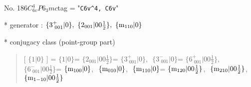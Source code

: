 \documentclass[fleqn,10pt,landscape]{jsarticle}
\begin{document}
\newpage

No. 186\quad$C_{6v}^{4}$\quad$P6_3mc$\quad[ hexagonal ]
tag = "{\tt C6v^4, C6v}"

* generator : $\{3^{+}_{\,\,001}|0\},\,\,\{2{}_{001}|0 0 \frac{1}{2}\},\,\,\{{\rm m}_{110}|0\}$

* conjugacy class (point-group part)
\begin{quote}
[ $\{1|0\}$ ] = \quad $\{1|0\}$\newline[ $\{2{}_{001}|0 0 \frac{1}{2}\}$ ] = \quad $\{2{}_{001}|0 0 \frac{1}{2}\}$\newline[ $\{3^{+}_{\,\,001}|0\}$ ] = \quad $\{3^{+}_{\,\,001}|0\}$,\,\, $\{3^{-}_{\,\,001}|0\}$\newline[ $\{6^{+}_{\,\,001}|0 0 \frac{1}{2}\}$ ] = \quad $\{6^{+}_{\,\,001}|0 0 \frac{1}{2}\}$,\,\, $\{6^{-}_{\,\,001}|0 0 \frac{1}{2}\}$\newline[ $\{{\rm m}_{100}|0\}$ ] = \quad $\{{\rm m}_{100}|0\}$,\,\, $\{{\rm m}_{010}|0\}$,\,\, $\{{\rm m}_{110}|0\}$\newline[ $\{{\rm m}_{120}|0 0 \frac{1}{2}\}$ ] = \quad $\{{\rm m}_{120}|0 0 \frac{1}{2}\}$,\,\, $\{{\rm m}_{210}|0 0 \frac{1}{2}\}$,\,\, $\{{\rm m}_{1-10}|0 0 \frac{1}{2}\}$\newline
\end{quote}
\end{document}
